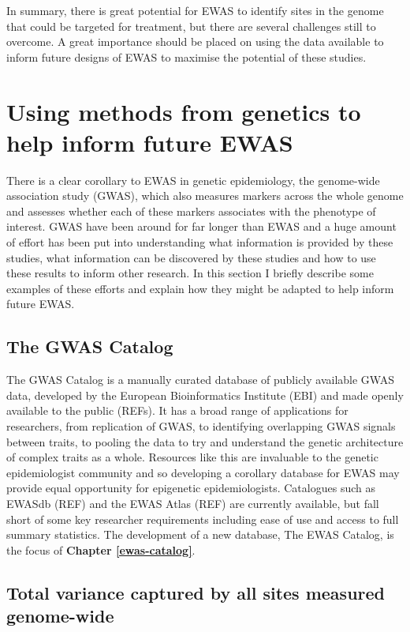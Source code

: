 \documentclass[11pt,twoside]{bristolthesis}
\begin{document}
In summary, there is great potential for EWAS to identify sites in the genome that could be targeted for treatment, but there are several challenges still to overcome. A great importance should be placed on using the data available to inform future designs of EWAS to maximise the potential of these studies.

\hypertarget{genetics-in-ewas}{%
\section{Using methods from genetics to help inform future EWAS}\label{genetics-in-ewas}}

There is a clear corollary to EWAS in genetic epidemiology, the genome-wide association study (GWAS), which also measures markers across the whole genome and assesses whether each of these markers associates with the phenotype of interest. GWAS have been around for far longer than EWAS and a huge amount of effort has been put into understanding what information is provided by these studies, what information can be discovered by these studies and how to use these results to inform other research. In this section I briefly describe some examples of these efforts and explain how they might be adapted to help inform future EWAS.

\hypertarget{gwas-catalog}{%
\subsection{The GWAS Catalog}\label{gwas-catalog}}

The GWAS Catalog is a manually curated database of publicly available GWAS data, developed by the European Bioinformatics Institute (EBI) and made openly available to the public (REFs). It has a broad range of applications for researchers, from replication of GWAS, to identifying overlapping GWAS signals between traits, to pooling the data to try and understand the genetic architecture of complex traits as a whole. Resources like this are invaluable to the genetic epidemiologist community and so developing a corollary database for EWAS may provide equal opportunity for epigenetic epidemiologists. Catalogues such as EWASdb (REF) and the EWAS Atlas (REF) are currently available, but fall short of some key researcher requirements including ease of use and access to full summary statistics. The development of a new database, The EWAS Catalog, is the focus of \textbf{Chapter \ref{ewas-catalog}}.

\hypertarget{heritability}{%
\subsection{Total variance captured by all sites measured genome-wide}\label{heritability}}
\end{document}
